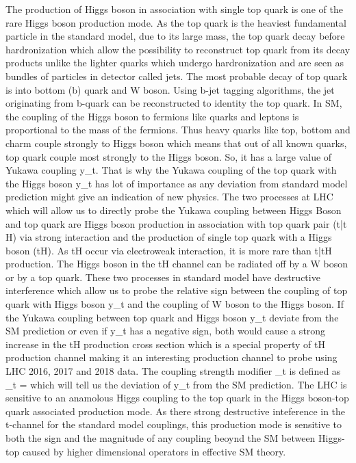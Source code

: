 \documentclass[final,3p]{CSP}
\begin{document}
The production of Higgs boson in association with single top quark is one of the rare Higgs boson production mode. As the top 
quark is the heaviest fundamental particle in the standard model, due to its large mass, the top quark decay before 
hardronization which allow the possibility to reconstruct top quark from its decay products unlike the lighter quarks which 
undergo hardronization and are seen as bundles of particles in detector called jets. The most probable decay of top quark is into 
bottom (b) quark and W boson. Using b-jet tagging algorithms, the jet originating from b-quark can be reconstructed to identity 
the top quark. In SM, the coupling of the Higgs boson to fermions like quarks and leptons is proportional to the mass of the 
fermions. Thus heavy quarks like top, bottom and charm couple strongly to Higgs boson which means that out of all known quarks, 
top quark couple most strongly to the Higgs boson. So, it has a large value of Yukawa coupling y_t. That is why the Yukawa 
coupling of the top quark with the Higgs boson y_t has lot of importance as any deviation from standard model prediction might 
give an indication of new physics. The two processes at LHC which will allow us to directly probe the Yukawa coupling between 
Higgs Boson and top quark are Higgs boson production in association with top quark pair (t\bar{t} H) via strong interaction and 
the production of single top quark with a Higgs boson (tH). As tH occur via electroweak interaction, it is more rare than 
t\bar{t}H production. The Higgs boson in the tH channel can be radiated off by a W boson or by a top quark. These two processes 
in standard model have destructive interference which allow us to probe the relative sign between the coupling of top quark with 
Higgs boson y_t and the coupling of W boson to the Higgs boson. If the Yukawa coupling between top quark and Higgs boson y_t 
deviate from the SM prediction or even if y_t has a negative sign, both would cause a strong increase in the tH production cross 
section which is a special property of tH production channel making it an interesting production channel to probe using LHC 
2016, 2017 and 2018 data. The coupling strength modifier \kappa_t is defined as \kappa_t =  which will tell us the 
deviation of y_t from the SM prediction. 
The LHC is sensitive to an anamolous Higgs coupling to the top quark in the Higgs boson-top quark associated production mode. As there 
strong destructive inteference in the t-channel for the standard model couplings, this production mode is sensitive to both the sign and 
the magnitude of any coupling beoynd the SM between Higgs-top caused by higher dimensional operators in effective SM theory.
\end{document}
